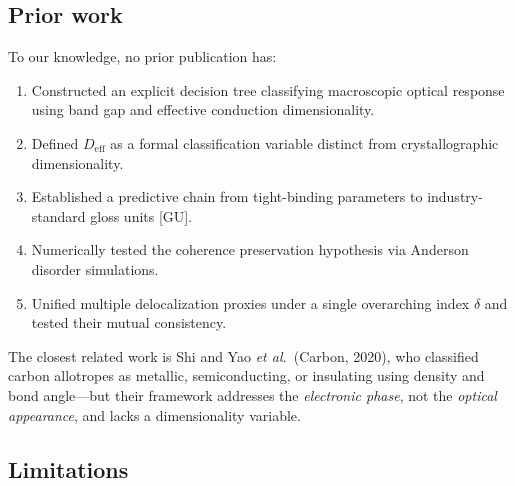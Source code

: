 \documentclass[twocolumn,showpacs,preprintnumbers,amsmath,amssymb,prb]{revtex4-2}
\begin{document}
\subsection{Prior work}

To our knowledge, no prior publication has:
\begin{enumerate}
  \item Constructed an explicit decision tree classifying macroscopic
    optical response using band gap and effective conduction
    dimensionality.
  \item Defined $D_\mathrm{eff}$ as a formal classification variable
    distinct from crystallographic dimensionality.
  \item Established a predictive chain from tight-binding parameters
    to industry-standard gloss units [GU].
  \item Numerically tested the coherence preservation hypothesis via
    Anderson disorder simulations.
  \item Unified multiple delocalization proxies under a single
    overarching index $\delta$ and tested their mutual consistency.
\end{enumerate}

The closest related work is Shi and Yao \textit{et al.}\ (Carbon, 2020),
who classified carbon allotropes as metallic, semiconducting, or
insulating using density and bond angle---but their framework addresses
the \emph{electronic phase}, not the \emph{optical appearance}, and
lacks a dimensionality variable.

\subsection{Limitations}
\end{document}
